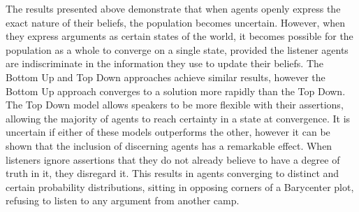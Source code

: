 The results presented above demonstrate that when agents openly express the exact nature of their beliefs, the population becomes uncertain. However, when they express arguments as certain states of the world, it becomes possible for the population as a whole to converge on a single state, provided the listener agents are indiscriminate in the information they use to update their beliefs. The Bottom Up and Top Down approaches achieve similar results, however the Bottom Up approach converges to a solution more rapidly than the Top Down. The Top Down model allows speakers to be more flexible with their assertions, allowing the majority of agents to reach certainty in a state at convergence. It is uncertain if either of these models outperforms the other, however it can be shown that the inclusion of discerning agents has a remarkable effect. When listeners ignore assertions that they do not already believe to have a degree of truth in it, they disregard it. This results in agents converging to distinct and certain probability distributions, sitting in opposing corners of a Barycenter plot, refusing to listen to any argument from another camp. 